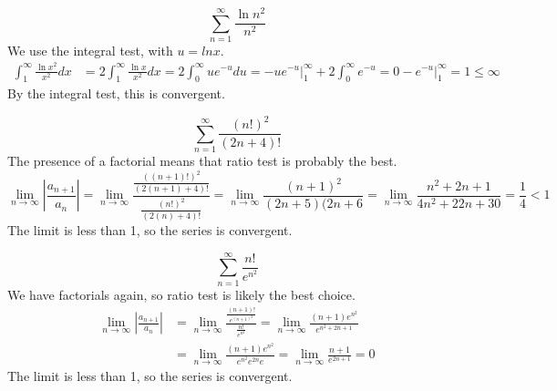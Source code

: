 \documentclass[fleqn,letterpaper]{report}
\begin{document}
\begin{example}
\begin{equation*}
\sum_{n=1}^\infty \frac{\ln n^2}{n^2}
\end{equation*}
We use the integral test, with $u = ln x$.
\begin{align*}
\int_1^\infty \frac{\ln x^2}{x^2} dx & = 2 \int_1^\infty
\frac{\ln x}{x^2} dx = 2 \int_0^\infty u e^{-u} du
= \left. - ue^{-u} \right|_1^\infty + 2 \int_0^\infty
e^{-u} = 0 - \left. e^{-u} \right|_1^\infty = 1 \leq \infty
\end{align*}
By the integral test, this is convergent.
\end{example}

\begin{example}
\begin{equation*}
\sum_{n=1}^\infty \frac{(n!)^2}{(2n+4)!}
\end{equation*}
The presence of a factorial means that ratio test is probably
the best.
\begin{equation*}
\lim_{n \rightarrow \infty} \left| \frac{a_{n+1}}{a_n} \right|
= \lim_{n \rightarrow \infty}
\frac{\frac{((n+1)!)^2}{(2(n+1)+4)!}}{\frac{(n!)^2}{(2(n)+4)!}}
= \lim_{n \rightarrow \infty} \frac{(n+1)^2}{(2n+5)(2n+6} 
= \lim_{n \rightarrow \infty} \frac{n^2+2n+1}{4n^2+ 22n + 30}
= \frac{1}{4} < 1
\end{equation*}
The limit is less than 1, so the series is convergent. 
\end{example}

\begin{example}
\begin{equation*}
\sum_{n=1}^\infty \frac{n!}{e^{n^2}}
\end{equation*}
We have factorials again, so ratio test is likely the best
choice.
\begin{align*}
\lim_{n \rightarrow \infty} \left| \frac{a_{n+1}}{a_n} \right|
& = \lim_{n \rightarrow \infty}
\frac{\frac{(n+1)!}{e^{(n+1)^2}}}{\frac{n!}{e^{n^2}}} 
= \lim_{n \rightarrow \infty}
\frac{(n+1)e^{n^2}}{e^{n^2+2n+1}} \\
& = \lim_{n \rightarrow \infty} \frac{(n+1)e^{n^2}}{e^{n^2}
e^{2n} e} 
= \lim_{n \rightarrow \infty} \frac{n+1}{e^{2n+1}} = 0 
\end{align*}
The limit is less than 1, so the series is convergent. 
\end{example}
\end{document}
